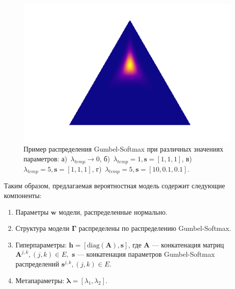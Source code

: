 \begin{figure}
\begin{minipage}[t]{.2\textwidth}
\subcaption{}
\end{minipage}
\hfill
 \begin{minipage}[t]{.2\textwidth}
   \includegraphics[width=\textwidth]{plots/notebooks/gs5_shift.png}
\subcaption{}
\end{minipage}

\caption{Пример распределения Gumbel-Softmax при различных значениях параметров: а)~$\lambda_{temp}\to0$, б)~$\lambda_{temp}=1, \mathbf{s}=[1,1,1]$, в)~$\lambda_{temp}=5, \mathbf{s}=[1,1,1]$, г)~$\lambda_{temp}=5, \mathbf{s}=[10,0.1,0.1].$}
\label{fig:gs}

\end{figure}

Таким образом, предлагаемая вероятностная модель содержит следующие компоненты:
\begin{enumerate}
\item Параметры $\mathbf{w}$ модели, распределенные нормально.
\item Структура модели $\boldsymbol{\Gamma}$ распределены по распределению Gumbel-Softmax.
\item Гиперпараметры: $\mathbf{h} = [\text{diag}(\mathbf{A}), \mathbf{s}]$, где $\mathbf{A}$ --- конкатенация матриц $\mathbf{A}^{j,k}, (j,k) \in E,$ $\mathbf{s}$ --- конкатенация параметров Gumbel-Softmax распределений $\mathbf{s}^{j,k}, (j,k) \in E$.
\item Метапараметры: $\boldsymbol{\lambda} = [\lambda_1, \lambda_2].$
\end{enumerate}

